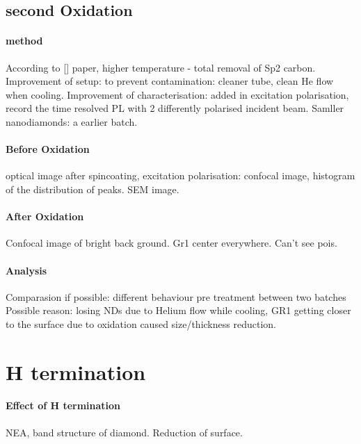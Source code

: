 \subsection[Second Oxidation]{second Oxidation}

\paragraph{method} According to [] paper, higher temperature - total removal of Sp2 carbon. Improvement of setup: to prevent contamination: cleaner tube, clean He flow when cooling. Improvement of characterisation: added in excitation polarisation, record the time resolved PL with 2 differently polarised incident beam. Samller nanodiamonds: a earlier batch.

\paragraph{Before Oxidation} optical image after spincoating, excitation polarisation: confocal image, histogram of the distribution of peaks. SEM image.

\paragraph{After Oxidation} Confocal image of bright back ground. Gr1 center everywhere. Can't see pois.

\paragraph{Analysis} 
Comparasion if possible: different behaviour pre treatment between two batches
Possible reason: losing NDs due to Helium flow while cooling, GR1 getting closer to the surface due to oxidation caused size/thickness reduction.


\section[H termination]{H termination}
\paragraph{Effect of H termination}

NEA, band structure of diamond. Reduction of surface.
